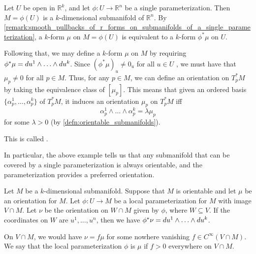 \documentclass[notoc,notitlepage]{tufte-book}
\begin{document}
\begin{eg}\label{eq:single_parameterization_submanifold}
  Let $U$ be open in $\mathbb{R}^k$, and let $\phi : U \to \mathbb{R}^n$ be a
  single parameterization. Then $M = \phi(U)$ is a $k$-dimensional submanifold
  of $\mathbb{R}^n$. By
  \cref{remark:smooth_pullbacks_of_r_forms_on_submanifolds_of_a_single_parameterization},
  a $k$-form $\mu$ on $M = \phi(U)$ is equivalent to a $k$-form $\phi^* \mu$ on
  $U$.

  Following that, we may define a $k$-form $\mu$ on $M$ by requiring $\phi^* \mu =
  \mathop{}\!d{u^1} \land \hdots \land \mathop{}\!d{u^k}$. Since $(\phi^* \mu)_u \neq 0_u$ for
  all $u \in U$ , we must have that $\mu_{p} \neq 0$ for all $p \in M$. Thus, for any $p \in
  M$, we can define an orientation on $T_p^* M$ by taking the equivalence class
  of $[\mu_p]$. This means that given an ordered basis $\{\alpha_p^1, \ldots,
  \alpha_p^k \}$ of $T_p^* M$, it induces an orientation $\mu_p$ on $T_p^* M$ 
  iff
  \begin{equation*}
    \alpha_p^1 \land \hdots \land \alpha_p^k = \lambda \mu_p
  \end{equation*}
  for some $\lambda > 0$ (by \cref{defn:orientable_submanifolds}).

  This is called .
\end{eg}

In particular, the above example tells us that any submanifold that can be
covered by a single parameterization is always orientable, and the
parameterization provides a preferred orientation.

\begin{defn}\label{defn:compatible_orientation}
  Let $M$ be a $k$-dimensional submanifold. Suppose that $M$ is orientable and
  let $\mu$ be an orientation for $M$. Let $\phi : U \to M$ be a local
  parameterization for $M$ with image $V \cap M$. Let $\nu$ be the orientation on
  $W \cap M$ given by $\phi$, where $W \subseteq V$. If the coordinates on $W$ 
  are $u^1, \ldots, u^n$, then we have $\phi^* \nu = \mathop{}\!d{u^1} \land \hdots
  \land \mathop{}\!d{u^k}$.

  On $V \cap M$, we would have $\nu = f\mu$ for some nowhere vanishing $f \in
  C^\infty(V \cap M)$. We say that the local parameterization $\phi$ is
   $\mu$ if $f > 0$ everywhere on $V
  \cap M$.
\end{defn}
\end{document}
